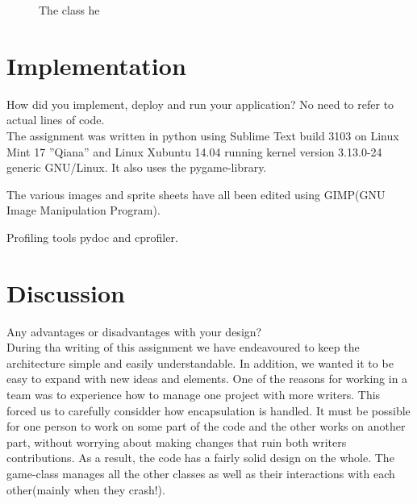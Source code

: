 \begin{figure}[h]
\begin{center}
\end{center}
\caption{The class he}\label{fig:ackseq}
\end{figure}




\section{Implementation}

How did you implement, deploy and run your application? No need to refer to actual lines of code.\\ 

The assignment was written in python using Sublime Text build 3103 on Linux Mint 17 ”Qiana” and Linux Xubuntu 14.04 running kernel version 3.13.0-24 generic GNU/Linux. It also uses the pygame-library.

The various images and sprite sheets have all been edited using 
GIMP(GNU Image Manipulation Program). 

Profiling tools pydoc and cprofiler. 

\section{Discussion}

Any advantages or disadvantages with your design?\\

During tha writing of this assignment we have endeavoured to keep the architecture simple and easily understandable. In addition, we wanted it to be easy to expand with new ideas and elements. One of the reasons for working in a team was to experience how to manage one project with more writers. This forced us to carefully considder how encapsulation is handled. It must be possible for one person to work on some 
part of the code and the other works on another part, without worrying about making changes that ruin both writers contributions. As a result, the code has a fairly solid design on the whole. The game-class manages all the other classes as well as their interactions with each other(mainly when they crash!). \\

